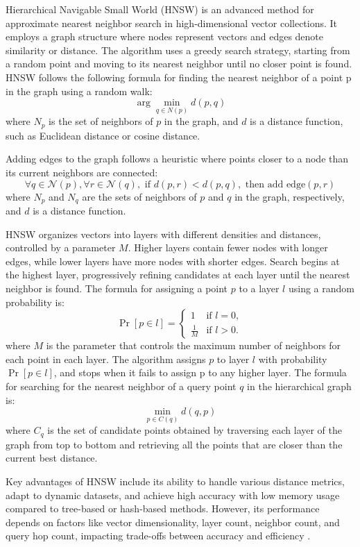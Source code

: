 Hierarchical Navigable Small World (HNSW) is an advanced method for approximate nearest neighbor search in high-dimensional vector collections. It employs a graph structure where nodes represent vectors and edges denote similarity or distance. The algorithm uses a greedy search strategy, starting from a random point and moving to its nearest neighbor until no closer point is found. HNSW follows the following formula for finding the nearest neighbor of a point p in the graph using a random walk:
\[
\arg\min_{q \in N(p)} d(p, q)
\]
where \(N_p\) is the set of neighbors of \(p\) in the graph, and
\(d\) is a distance function, such as Euclidean distance or cosine
distance.

Adding edges to the graph follows a heuristic where points closer to a node than its current neighbors are connected:
\[
\forall q \in \mathcal{N}(p), \forall r \in \mathcal{N}(q), \text{ if } d(p, r) < d(p, q), \text{ then add edge}(p, r)
\]
where \(N_p\) and \(N_q\) are the sets of neighbors of \(p\) and
\(q\) in the graph, respectively, and \(d\) is a distance function.

HNSW organizes vectors into layers with different densities and distances, controlled by a parameter \(M\). Higher layers contain fewer nodes with longer edges, while lower layers have more nodes with shorter edges. Search begins at the highest layer, progressively refining candidates at each layer until the nearest neighbor is found. The formula for assigning a point \(p\) to a layer \(l\) using a random probability is:
\[
\Pr[p \in l] = \begin{cases}
1 & \text{if } l = 0, \\
\frac{1}{M} & \text{if } l > 0.
\end{cases}
\]
where \(M\) is the parameter that controls the maximum number of neighbors for each point in each layer. The algorithm assigns \(p\) to layer \(l\) with probability \(\Pr[p \in l]\), and stops when it fails to assign p to any higher layer. The formula for searching for the nearest neighbor of a query point \(q\) in the hierarchical graph is:
\[
\min_{p \in C(q)} d(q, p)
\]
where \(C_q\) is the set of candidate points obtained by
traversing each layer of the graph from top to bottom and
retrieving all the points that are closer than the current best
distance.

Key advantages of HNSW include its ability to handle various distance metrics, adapt to dynamic datasets, and achieve high accuracy with low memory usage compared to tree-based or hash-based methods. However, its performance depends on factors like vector dimensionality, layer count, neighbor count, and query hop count, impacting trade-offs between accuracy and efficiency \cite{Han.18Oct2023}.

